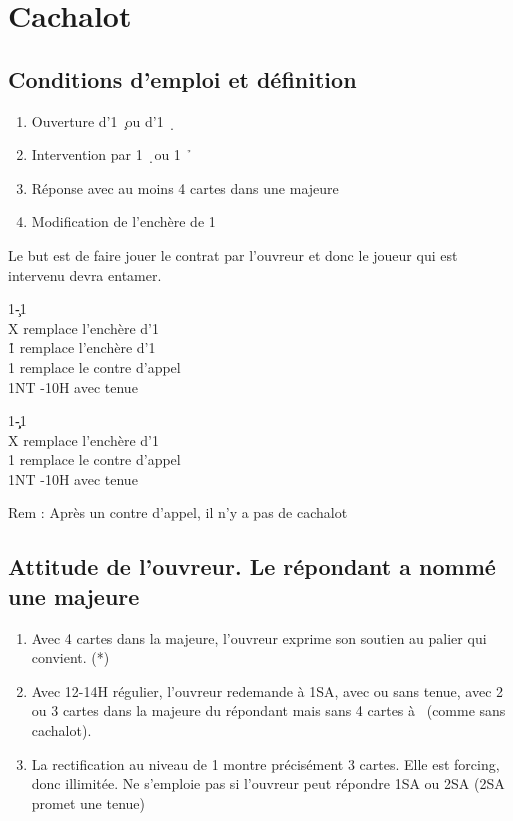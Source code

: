 \documentclass[a4paper]{article}
\begin{document}
\section{Cachalot}

\subsection{Conditions d'emploi et définition}

\begin{enumerate}
\item Ouverture d’1 \c\ ou d’1 \d\ 

\item Intervention par 1 \d\ ou 1 \h\ 

\item Réponse avec au moins 4 cartes dans une majeure

\item Modification de l’enchère de 1 \s 

\end{enumerate}

Le but est de faire jouer le contrat par l’ouvreur et donc le joueur 
qui est intervenu devra entamer.

\begin{bidtable}
1\c-1\d\\
X \> remplace l'enchère d'1\h \\
1\h \> remplace l'enchère d'1\s \\
1\s \> remplace le contre d'appel\\
1NT -10H avec tenue
\end{bidtable}

\begin{bidtable}
1\c\d-1\h\\
X \> remplace l'enchère d'1\s \\
1\s \> remplace le contre d'appel\\
1NT -10H avec tenue
\end{bidtable}

Rem : Après un contre d’appel, il n’y a pas de cachalot

\subsection{Attitude de l’ouvreur. Le répondant a 
nommé une majeure}

\begin{enumerate}
\item Avec 4 cartes dans la majeure, l’ouvreur exprime son soutien 
au palier qui convient. (*)

\item Avec 12-14H régulier, l’ouvreur redemande à 1SA, avec ou 
sans tenue, avec 2 ou 3 cartes dans la majeure du répondant 
mais sans 4 cartes à \s\ (comme sans cachalot).

\item La rectification au niveau de 1 montre précisément 3 cartes. 
Elle est forcing, donc illimitée. Ne s’emploie pas si l’ouvreur 
peut répondre 1SA ou 2SA (2SA promet une tenue)

\end{enumerate}
\end{document}
